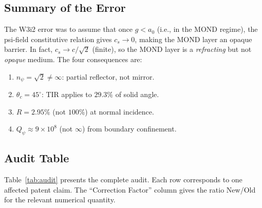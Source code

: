\documentclass[aps,prd,twocolumn,superscriptaddress]{revtex4-2}
\newcommand{\Qpsi}{Q_\psi}
\newcommand{\npsi}{n_\psi}
\newcommand{\ee}[1]{\times 10^{#1}}
\begin{document}
\subsection{Summary of the Error}

The W3i2 error was to assume that once $g < a_0$ (i.e., in the MOND
regime), the psi-field constitutive relation gives $c_s \to 0$, making
the MOND layer an opaque barrier.  In fact, $c_s \to c/\sqrt{2}$
(finite), so the MOND layer is a \emph{refracting} but not \emph{opaque}
medium.  The four consequences are:
\begin{enumerate}
  \item $\npsi = \sqrt{2} \neq \infty$: partial reflector, not mirror.
  \item $\theta_c = 45^\circ$: TIR applies to $29.3\%$ of solid angle.
  \item $R = 2.95\%$ (not $100\%$) at normal incidence.
  \item $\Qpsi \approx 9\ee8$ (not $\infty$) from boundary confinement.
\end{enumerate}

\subsection{Audit Table}

Table~\ref{tab:audit} presents the complete audit.  Each row corresponds
to one affected patent claim.  The ``Correction Factor'' column gives
the ratio New/Old for the relevant numerical quantity.
\end{document}
